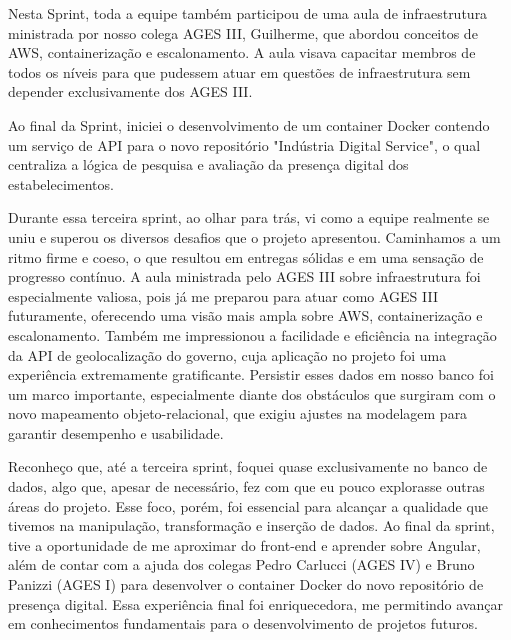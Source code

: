 \indent Nesta Sprint, toda a equipe também participou de uma aula de infraestrutura ministrada por nosso colega AGES III, Guilherme, que abordou conceitos de AWS, containerização e escalonamento. A aula visava capacitar membros de todos os níveis para que pudessem atuar em questões de infraestrutura sem depender exclusivamente dos AGES III.\par

\indent Ao final da Sprint, iniciei o desenvolvimento de um container Docker contendo um serviço de API para o novo repositório "Indústria Digital Service", o qual centraliza a lógica de pesquisa e avaliação da presença digital dos estabelecimentos.\par

\begin{reflection}
\indent \originaltab{}Durante essa terceira sprint, ao olhar para trás, vi como a equipe realmente se uniu e superou os diversos desafios que o projeto apresentou. Caminhamos a um ritmo firme e coeso, o que resultou em entregas sólidas e em uma sensação de progresso contínuo. A aula ministrada pelo AGES III sobre infraestrutura foi especialmente valiosa, pois já me preparou para atuar como AGES III futuramente, oferecendo uma visão mais ampla sobre AWS, containerização e escalonamento. Também me impressionou a facilidade e eficiência na integração da API de geolocalização do governo, cuja aplicação no projeto foi uma experiência extremamente gratificante. Persistir esses dados em nosso banco foi um marco importante, especialmente diante dos obstáculos que surgiram com o novo mapeamento objeto-relacional, que exigiu ajustes na modelagem para garantir desempenho e usabilidade.\par

\indent \originaltab{}Reconheço que, até a terceira sprint, foquei quase exclusivamente no banco de dados, algo que, apesar de necessário, fez com que eu pouco explorasse outras áreas do projeto. Esse foco, porém, foi essencial para alcançar a qualidade que tivemos na manipulação, transformação e inserção de dados. Ao final da sprint, tive a oportunidade de me aproximar do front-end e aprender sobre Angular, além de contar com a ajuda dos colegas Pedro Carlucci (AGES IV) e Bruno Panizzi (AGES I) para desenvolver o container Docker do novo repositório de presença digital. Essa experiência final foi enriquecedora, me permitindo avançar em conhecimentos fundamentais para o desenvolvimento de projetos futuros.\par

\end{reflection}
